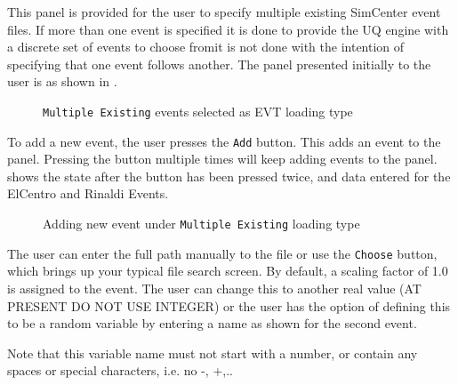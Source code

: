 This panel is provided for the user to specify multiple existing SimCenter
event files.  If more than one event is specified it is done to
provide the UQ engine with a discrete set of events to choose
from\textemdash it is not done with the intention of specifying that
one event follows another.  The panel presented initially to the user
is as shown in .

\begin{figure}[!htbp]
  \caption{\texttt{Multiple Existing} events selected as EVT loading type}
  \label{fig:figure4}
\end{figure}

To add a new event, the user presses the \texttt{Add} button. This adds an
event to the panel. Pressing the button multiple times will keep
adding events to the panel.  shows the state after
the button has been pressed twice, and data entered for the ElCentro
and Rinaldi Events.

\begin{figure}[!htbp]
  \caption{Adding new event under \texttt{Multiple Existing} loading type}
  \label{fig:figure5}
\end{figure}

The user can enter the full path manually to the file or use the
\texttt{Choose} button, which brings up your typical file search screen.  By
default, a scaling factor of 1.0 is assigned to the event.  The user
can change this to another real value (AT PRESENT DO NOT USE INTEGER)
or the user has the option of defining this to be a random variable by
entering a name as shown for the second event.

Note that this variable name must not start with a number, or contain
any spaces or special characters, i.e. no -, +,..

